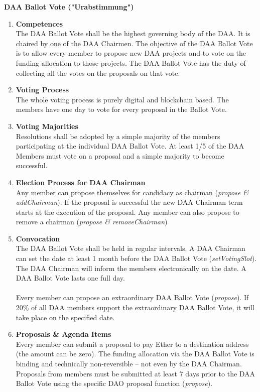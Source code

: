 \item \textbf{DAA Ballot Vote ("Urabstimmung")} \\
\begin{enumerate}[label=\textbf{\arabic*.}]
    \item \textbf{Competences} \\
    The DAA Ballot Vote shall be the highest governing body of the DAA.
    It is chaired by one of the DAA Chairmen.
    The objective of the DAA Ballot Vote is to allow every member to propose new DAA projects and to vote on the funding allocation to those projects.
    The DAA Ballot Vote has the duty of collecting all the votes on the proposals on that vote.

    \item \textbf{Voting Process} \\
    The whole voting process is purely digital and blockchain based.
    The members have one day to vote for every proposal in the Ballot Vote.

    \item \textbf{Voting Majorities} \\
    Resolutions shall be adopted by a simple majority of the members participating at the individual DAA Ballot Vote.
    At least 1/5 of the DAA Members must vote on a proposal and a simple majority to become successful.

    \item \textbf{Election Process for DAA Chairman} \\
    Any member can propose themselves for candidacy as chairman (\emph{propose \& addChairman}).
    If the proposal is successful the new DAA Chairman term starts at the execution of the proposal.
    Any member can also propose to remove a chairman (\emph{propose \& removeChairman})

    \item \textbf{Convocation} \\
    The DAA Ballot Vote shall be held in regular intervals.
    A DAA Chairman can set the date at least 1 month before the DAA Ballot Vote (\emph{setVotingSlot}).
    The DAA Chairman will inform the members electronically on the date.
    A DAA Ballot Vote lasts one full day. \\ \\

    Every member can propose an extraordinary DAA Ballot Vote (\emph{propose}).
    If 20\% of all DAA members support the extraordinary DAA Ballot Vote, it will take place on the specified date.

    \item \textbf{Proposals \& Agenda Items} \\
    Every member can submit a proposal to pay Ether to a destination address (the amount can be zero).
    The funding allocation via the DAA Ballot Vote is binding and technically non-reversible – not even by the DAA Chairman.
    Proposals from members must be submitted at least 7 days prior to the DAA Ballot Vote using the specific DAO proposal function (\emph{propose}).

\end{enumerate}
